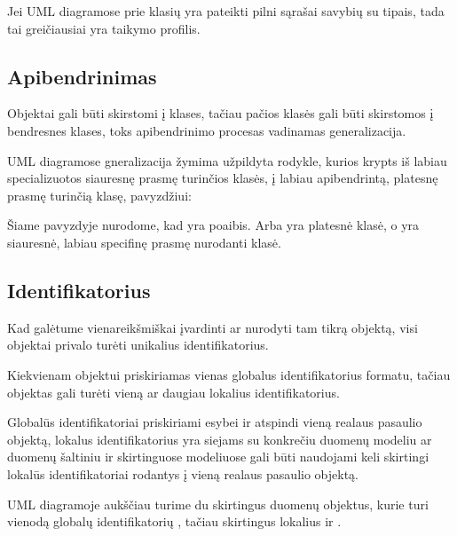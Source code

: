 \documentclass[letterpaper,10pt,lithuanian]{sphinxmanual}
\begin{document}
\sphinxAtStartPar
Jei UML diagramose prie klasių yra pateikti pilni sąrašai savybių su tipais,
tada tai greičiausiai yra taikymo profilis.


\subsection{Apibendrinimas}
\label{\detokenize{modelis:apibendrinimas}}\label{\detokenize{modelis:uml-generalization}}
\sphinxAtStartPar
Objektai gali būti skirstomi į klases, tačiau pačios klasės gali būti
skirstomos į bendresnes klases, toks apibendrinimo procesas vadinamas
generalizacija.

\sphinxAtStartPar
UML diagramose gneralizacija žymima užpildyta rodykle, kurios krypts iš labiau
specializuotos siauresnę prasmę turinčios klasės, į labiau apibendrintą,
platesnę prasmę turinčią klasę, pavyzdžiui:

\sphinxAtStartPar
Šiame pavyzdyje nurodome, kad  yra  poaibis. Arba
 yra platesnė klasė, o  yra siauresnė, labiau
specifinę prasmę nurodanti klasė.


\subsection{Identifikatorius}
\label{\detokenize{modelis:identifikatorius}}
\sphinxAtStartPar
Kad galėtume vienareikšmiškai įvardinti ar nurodyti tam tikrą objektą, visi
objektai privalo turėti unikalius identifikatorius.

\sphinxAtStartPar
Kiekvienam objektui priskiriamas vienas globalus identifikatorius  formatu, tačiau objektas gali turėti vieną ar daugiau lokalius
identifikatorius.

\sphinxAtStartPar
Globalūs identifikatoriai priskiriami esybei ir atspindi vieną realaus pasaulio
objektą, lokalus identifikatorius yra siejams su konkrečiu duomenų modeliu ar
duomenų šaltiniu ir skirtinguose modeliuose gali būti naudojami keli skirtingi
lokalūs identifikatoriai rodantys į vieną realaus pasaulio objektą.

\sphinxAtStartPar
UML diagramoje aukščiau turime du skirtingus duomenų objektus, kurie turi
vienodą globalų identifikatorių , tačiau
skirtingus lokalius  ir .
\end{document}
